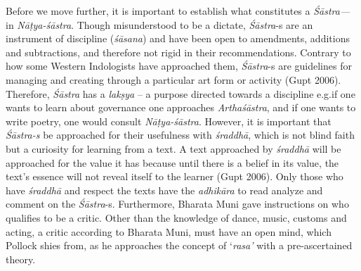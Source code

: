 Before we move further, it is important to establish what constitutes a \textsl{Śāstra---} in \textsl{Nāṭya-śāstra}. Though misunderstood to be a dictate, \hbox{\textsl{Śāstra}-s} are an instrument of discipline (\textsl{śāsana}) and have been open to amendments, additions and subtractions, and therefore not rigid in their recommendations. Contrary to how some Western Indologists have approached them, \textsl{Śāstra}-s are guidelines for managing and creating through a particular art form or activity (Gupt 2006). Therefore, \textsl{Śāstra} has a \textsl{lakṣya} -- a purpose directed towards a discipline e.g.\@ if one wants to learn about governance one approaches \textsl{Arthaśāstra}, and if one wants to write poetry, one would consult \textsl{Nāṭya-śāstra}. However, it is important that \textsl{Śāstra-s} be approached for their usefulness with \textsl{śraddhā}, which is not blind faith but a curiosity for learning from a text. A text approached by \textsl{śraddhā} will be approached for the value it has because until there is a belief in its value, the text’s essence will not reveal itself to the learner (Gupt 2006).  Only those who have \textsl{śraddhā} and respect the texts have the \textsl{adhikāra} to read analyze and comment on the \hbox{\textsl{Śāstra}-s}. Furthermore, Bharata Muni gave instructions on who qualifies to be a critic. Other than the knowledge of dance, music, customs and acting, a critic according to Bharata Muni, must have an open mind, which Pollock shies from, as he approaches the concept of ‘\textsl{rasa’} with a pre-ascertained theory.

\newpage

